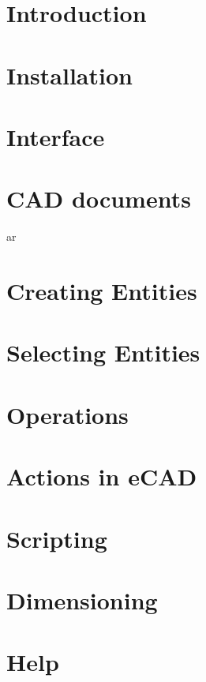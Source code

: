 \documentclass[12pt]{article}
\begin{document}
\begin{screen}
\ppttitle
\end{screen}
\footskip 0.7cm
\newpage


\newpage
\section{Introduction}

\newpage
\section{Installation}

\newpage
\section{Interface}

\newpage
\section{CAD documents}
ar
\newpage
\section{Creating Entities}

\newpage
\section{Selecting Entities}

\newpage
\section{Operations}

\newpage
\section{Actions in eCAD}

\newpage
\section{Scripting}

\newpage
\section{Dimensioning}

\newpage
\section{Help}

\end{document}
